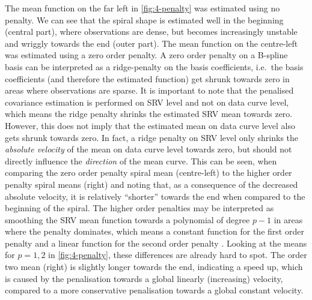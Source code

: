 The mean function on the far left in \cref{fig:4-penalty} was estimated using no penalty.
We can see that the spiral shape is estimated well in the beginning (central part), where observations are dense, but becomes increasingly unstable and wriggly towards the end (outer part).
The mean function on the centre-left was estimated using a zero order penalty.
A zero order penalty on a B-spline basis can be interpreted as a ridge-penalty on the basis coefficients, i.e.\ the basis coefficients (and therefore the estimated function) get shrunk towards zero in areas where observations are sparse.
It is important to note that the penalised covariance estimation is performed on SRV level and not on data curve level, which means the ridge penalty shrinks the estimated SRV mean towards zero.
However, this does not imply that the estimated mean on data curve level also gets shrunk towards zero.
In fact, a ridge penalty on SRV level only shrinks the \emph{absolute velocity} of the mean on data curve level towards zero, but should not directly influence the \emph{direction} of the mean curve.
This can be seen, when comparing the zero order penalty spiral mean (centre-left) to the higher order penalty spiral means (right) and noting that, as a consequence of the decreased absolute velocity, it is relatively \enquote{shorter} towards the end when compared to the beginning of the spiral.
The higher order penalties may be interpreted as smoothing the SRV mean function towards a polynomial of degree $p-1$ in areas where the penalty dominates, which means a constant function for the first order penalty and a linear function for the second order penalty \parencite[see e.g.][435]{FahrmeierEtAl2013}.
Looking at the means for $p = 1,2$ in \cref{fig:4-penalty}, these differences are already hard to spot.
The order two mean (right) is slightly longer towards the end, indicating a speed up, which is caused by the penalisation towards a global linearly (increasing) velocity, compared to a more conservative penalisation towards a global constant velocity. 


